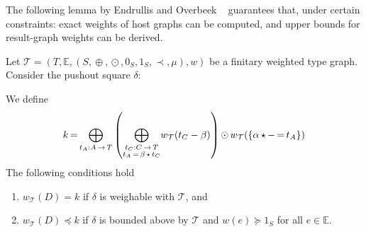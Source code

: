 The following lemma by Endrullis and Overbeek ~\cite{endrullis2024generalized_arxiv_v2} guarantees that, under certain constraints: exact weights of host graphs can be computed, and upper bounds for result-graph weights can be derived. 
\begin{lemma}
    \label{nwf:lem_4d13}
    Let $\mathcal{T} \mathop{=} (T,\mathbb{E}, (S, \mathop{\oplus}, \mathop{\odot}, 0_S, 1_S, \prec, \mu), w)$ be a finitary weighted type graph. Consider the pushout square $\delta$:
    \begin{center}
    \end{center}
    We define
     \[k \mathop{=} \underset{t_A:A \mathop{\rightarrow} T}{\mathop{\bigoplus}}
            \left ( 
                \underset{\substack{t_C:C \mathop{\rightarrow} T\\
                                            t_A \mathop{=} \beta \mathop{\star} t_C }}{\mathop{\bigoplus}}
                        w_\mathcal{T}(t_C - \beta)     
                 \right ) 
            \mathop{\odot} 
                w_\mathcal{T}(\{\alpha \mathop{\star} - \mathop{=} t_A\})
    \]
    The following conditions hold
    \begin{enumerate}[label=(\Alph*)]
        \item  $w_\mathcal{T}(D)=k$ if $\delta$ is weighable with $\mathcal{T}$, and
        \item  $w_\mathcal{T}(D)\mathop{\preceq} k$ if $\delta$ is bounded above by $\mathcal{T}$  and \(w(e) \mathop{\succeq} 1_S\) for all $e \mathop{\in} \mathbb{E}$.
    \end{enumerate}
\end{lemma}

